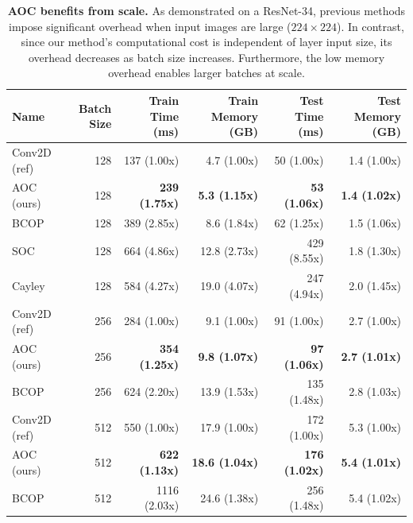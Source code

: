 \begin{table}[ht]
    \centering
    \small
    \begin{tabular}{lrrrrr}
        \textbf{Name} & \textbf{Batch Size} & \textbf{Train Time (ms)} & \textbf{Train Memory (GB)} & \textbf{Test Time (ms)} & \textbf{Test Memory (GB)} \\
        \hline
            Conv2D (ref) & 128 & 137 (1.00x) & 4.7 (1.00x) & 50 (1.00x) & 1.4 (1.00x) \\
            AOC (ours) & 128 & \textbf{239 (1.75x)} & \textbf{5.3 (1.15x)} & \textbf{53 (1.06x)} & \textbf{1.4 (1.02x)} \\ 
            BCOP & 128 & 389 (2.85x) & 8.6 (1.84x) & 62 (1.25x) & 1.5 (1.06x) \\
            SOC & 128 & 664 (4.86x) & 12.8 (2.73x) & 429 (8.55x) & 1.8 (1.30x) \\
            Cayley & 128 & 584 (4.27x) & 19.0 (4.07x) & 247 (4.94x) & 2.0 (1.45x) \\
        \hline
            Conv2D (ref) & 256 & 284 (1.00x) & 9.1 (1.00x) & 91 (1.00x) & 2.7 (1.00x) \\ 
            AOC (ours) & 256 & \textbf{354 (1.25x)} & \textbf{9.8 (1.07x)} & \textbf{97 (1.06x)} & \textbf{2.7 (1.01x)} \\ 
            BCOP & 256 & 624 (2.20x) & 13.9 (1.53x) & 135 (1.48x) & 2.8 (1.03x) \\
        \hline
            Conv2D (ref) & 512 & 550 (1.00x) & 17.9 (1.00x) & 172 (1.00x) & 5.3 (1.00x) \\
            AOC (ours) & 512 & \textbf{622 (1.13x)} & \textbf{18.6 (1.04x)} & \textbf{176 (1.02x)} & \textbf{5.4 (1.01x)} \\ 
            BCOP & 512 & 1116 (2.03x) & 24.6 (1.38x) & 256 (1.48x) & 5.4 (1.02x) \\
    \end{tabular}
    \caption{\textbf{AOC benefits from scale.} As demonstrated on a ResNet-34, previous methods impose significant overhead when input images are large ($224 \times 224$). In contrast, since our method's computational cost is independent of layer input size, its overhead decreases as batch size increases. Furthermore, the low memory overhead enables larger batches at scale.\vspace{-4mm}}
    \label{tab:comparison_overhead}
\end{table}